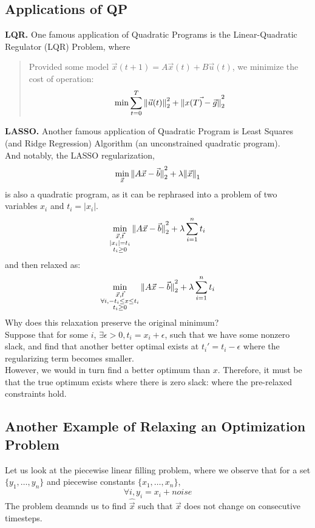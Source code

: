 \subsection{Applications of QP}
\textbf{LQR.} One famous application of Quadratic Programs is the Linear-Quadratic Regulator (LQR) Problem, where
\begin{quote}
    Provided some model $\vec{x}(t + 1) = A \vec{x}(t) + B \vec{u}(t)$, we minimize the cost of operation:
    \[
        \min \sum_{t = 0}^T \pnorm[2]{\vec{u}(t)}{2} + \pnorm[2]{\vec{x(T) - \vec{g}}}{2}
    \]
\end{quote}

\textbf{LASSO.} Another famous application of Quadratic Program is Least Squares (and Ridge Regression) Algorithm (an unconstrained quadratic program). \\
And notably, the LASSO regularization,
\[
    \min_{\vec{x}} \pnorm[2]{A \vec{x} - \vec{b}}{2} + \lambda \pnorm{\vec{x}}{1}
\]
is also a quadratic program, as it can be rephrased into a problem of two variables $x_i$ and $t_i = |x_i|$. \\
\[
    \min_{
        \substack{
            \vec{x}, \vec{t} \\
            |x_i| = t_i \\
            t_i \geq 0
        }
    } \pnorm[2]{A \vec{x} - \vec{b}}{2} + \lambda \sum_{i = 1}^n t_i
\]
and then relaxed as:
\[
    \min_{
        \substack{
            \vec{x}, \vec{t} \\
            \forall i, -t_i \leq x \leq t_i \\
            t_i \geq 0
        }
    } \pnorm[2]{A \vec{x} - \vec{b}}{2} + \lambda \sum_{i = 1}^n t_i
\]
Why does this relaxation preserve the original minimum? \\
Suppose that for some $i$, $\exists \epsilon > 0, t_i = x_i + \epsilon$, such that we have some nonzero slack, and find that another better optimal exists at ${t_i}' = t_i - \epsilon$ where the regularizing term becomes smaller. \\
However, we would in turn find a better optimum than $x$. Therefore, it must be that the true optimum exists where there is zero slack: where the pre-relaxed constraints hold.

\subsection{Another Example of Relaxing an Optimization Problem}
Let us look at the piecewise linear filling problem, where we observe that for a set $\{y_1, \dots, y_n\}$ and piecewise constants $\{x_1, \dots, x_n\}$,
\[
    \forall i, y_i = x_i + noise
\]
The problem deamnds us to find $\hat{\vec{x}}$ such that $\hat{\vec{x}}$ does not change on consecutive timesteps.

